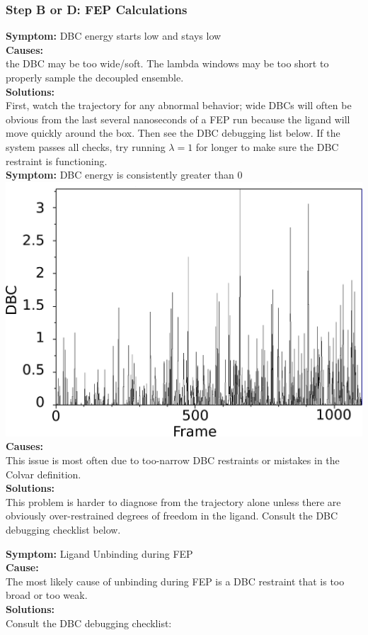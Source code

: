 \documentclass[9pt,tutorial]{Styling/livecoms}
\begin{document}
\subsubsection{Step B or D: FEP Calculations}
\noindent\textbf{Symptom:}  DBC energy starts low and stays low\\
\textbf{Causes:}\\
the DBC may be too wide/soft. The lambda windows may be too short to properly sample the decoupled ensemble.\\
\textbf{Solutions:}\\
First, watch the trajectory for any abnormal behavior; wide DBCs will often be obvious from the last several nanoseconds of a FEP run because the ligand will move quickly around the box. Then see the DBC debugging list below. If the system passes all checks, try running $\lambda=1$ for longer to make sure the DBC restraint is functioning.\\

\noindent\textbf{Symptom:} DBC energy is consistently greater than 0\\
\includegraphics[width=0.9\linewidth]{tightDBC_alchsite.png}
\textbf{Causes:}\\
This issue is most often due to too-narrow DBC restraints or mistakes in the Colvar definition.\\
\textbf{Solutions:}\\
This problem is harder to diagnose from the trajectory alone unless there are obviously over-restrained degrees of freedom in the ligand. Consult the DBC debugging checklist below.

\noindent\textbf{Symptom:} Ligand Unbinding during FEP\\
\textbf{Cause:}\\
The most likely cause of unbinding during FEP is a DBC restraint that is too broad or too weak.\\
\textbf{Solutions:}\\
 Consult the DBC debugging checklist:\\
\end{document}
